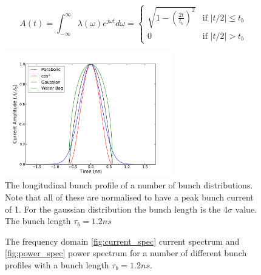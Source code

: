 \begin{equation}
A\left( t \right) = \int^{\infty}_{-\infty} \lambda \left( \omega \right) e^{j\omega t} d\omega = 
\begin{cases}
\sqrt{1-\left( \frac{2t}{t_{b}}\right)^{2}} &\textrm{if $| t/2 | \leq t_{b}$}\\
0								&\textrm{if $| t/2 | > t_{b}$}
\end{cases}
\label{eqn:water_bag_profile}
\end{equation}

\begin{figure}
\begin{center}
\includegraphics[width=0.65\textwidth]{Wakefields_and_Impedances/figures/bunch_profile_12ns.pdf}
\end{center}
\label{fig:time_bunch_profiles}
\caption{The longitudinal bunch profile of a number of bunch distributions. Note that all of these are normalised to have a peak bunch current of 1. For the gaussian distribution the bunch length is the 4$\sigma$ value. The bunch length $\tau_{b} = 1.2ns$}
\end{figure}

\begin{figure}
\caption{The frequency domain \ref{fig:current_spec} current spectrum and \ref{fig:power_spec} power spectrum for a number of different bunch profiles with a bunch length $\tau_{b} = 1.2ns$.}
\label{fig:freq_dom_prof}
\end{figure}

